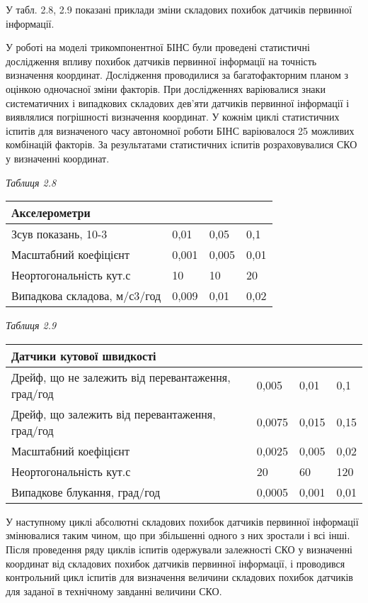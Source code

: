 У табл. 2.8, 2.9 показані приклади зміни складових  похибок датчиків первинної інформації.

У роботі на моделі трикомпонентної БІНС були проведені статистичні дослідження впливу похибок датчиків 
первинної інформації на точність визначення координат. Дослідження проводилися за багатофакторним планом 
з оцінкою одночасної зміни факторів. При дослідженнях варіювалися знаки систематичних і випадкових складових 
дев'яти датчиків первинної інформації і виявлялися погрішності визначення координат. У кожнім циклі статистичних 
іспитів для визначеного часу автономної роботи БІНС варіювалося 25 можливих комбінацій факторів. За результатами 
статистичних іспитів розраховувалися СКО у визначенні координат.    



\textit{Таблиця 2.8}

\begin{tabular}{|p{2.3in}|p{0.7in}|p{0.7in}|p{0.7in}|} \hline 
\multicolumn{4}{|p{1in}|}{Акселерометри} \\ \hline 
Зсув показань, 10-3 & 0,01 & 0,05 & 0,1 \\ \hline 
Масштабний коефіцієнт & 0,001 & 0,005 & 0,01 \\ \hline 
Неортогональність кут.с & 10 & 10 & 20 \\ \hline 
Випадкова складова, м/с3/год & 0,009 & 0,01 & 0,02 \\ \hline 
\end{tabular}



\textit{Таблиця 2.9}

\begin{tabular}{|p{2.3in}|p{0.7in}|p{0.7in}|p{0.7in}|} \hline 
\multicolumn{4}{|p{1in}|}{Датчики кутової швидкості} \\ \hline 
Дрейф, що не залежить від перевантаження, град/год & 0,005 & 0,01 & 0,1 \\ \hline 
Дрейф, що залежить від перевантаження, град/год & 0,0075 & 0,015 & 0,15 \\ \hline 
Масштабний коефіцієнт & 0,0025 & 0,005 & 0,02 \\ \hline 
Неортогональність кут.с & 20 & 60 & 120 \\ \hline 
Випадкове блукання, град/год & 0,0005 & 0,001 & 0,01 \\ \hline 
\end{tabular}



У наступному циклі абсолютні складових похибок датчиків первинної інформації змінювалися таким чином, 
що при збільшенні одного з них зростали і всі інші. Після проведення ряду циклів іспитів одержували 
залежності СКО у визначенні координат від складових похибок датчиків первинної інформації, і проводився 
контрольний цикл іспитів для визначення величини складових похибок датчиків для заданої в технічному завданні величини СКО. 

